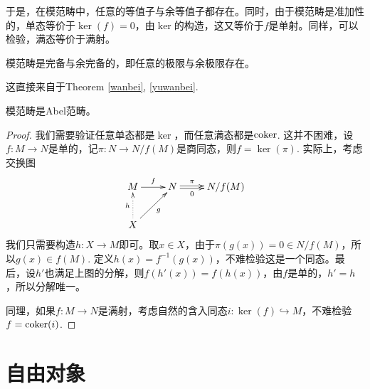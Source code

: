 于是，在模范畴中，任意的等值子与余等值子都存在。同时，由于模范畴是准加性的，单态等价于$\ker(f)=0$，由$\ker$的构造，这又等价于$f$是单射。同样，可以检验，满态等价于满射。

\begin{thm}
模范畴是完备与余完备的，即任意的极限与余极限存在。
\end{thm}

这直接来自于Theorem \ref{wanbei}, \ref{yuwanbei}.

\begin{thm}
模范畴是Abel范畴。
\end{thm}

\begin{proof}
我们需要验证任意单态都是$\ker$，而任意满态都是$\operatorname{coker}$. 这并不困难，设$f:M\to N$是单的，记$\pi:N\to N/f(M)$是商同态，则$f=\ker(\pi)$. 实际上，考虑交换图
\[
\begin{xy}
	\xymatrix{
		M\ar[r]^-{f}&N\ar@<0.3ex>[r]^-{\pi} \ar@<-0.3ex>[r]_-{0}&N/f(M)\\
		X\ar@{.>}[u]^-{h}\ar[ur]_-{g}
	}
\end{xy}
\]
我们只需要构造$h:X\to M$即可。取$x\in X$，由于$\pi (g(x))=0\in N/f(M)$，所以$g(x)\in f(M)$. 定义$h(x)=f^{-1}(g(x))$，不难检验这是一个同态。最后，设$h'$也满足上图的分解，则$f(h'(x))=f(h(x))$，由$f$是单的，$h'=h$，所以分解唯一。

同理，如果$f:M\to N$是满射，考虑自然的含入同态$i:\ker(f)\hookrightarrow M$，不难检验$f=\operatorname{coker}(i)$.
\end{proof}

\section{自由对象}



